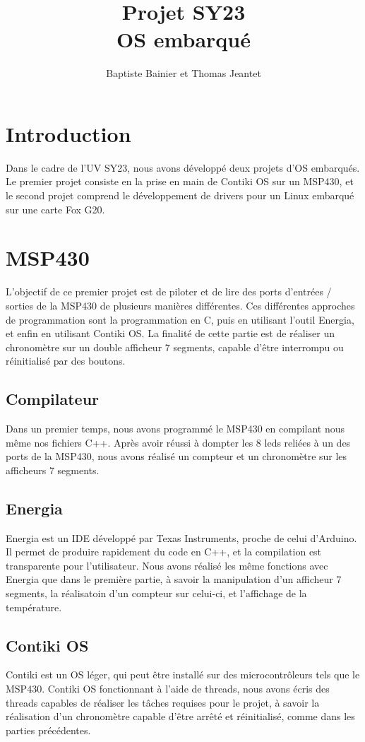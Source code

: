 \documentclass[a4paper,12pt]{article}
\author{Baptiste Bainier et Thomas Jeantet}
\title{Projet SY23\\OS embarqué}
\begin{document}
\maketitle
\newpage
\newpage


\section*{Introduction}

Dans le cadre de l'UV SY23, nous avons développé deux projets d'OS embarqués. Le premier projet consiste en la prise en main de Contiki OS sur un MSP430, et le second projet comprend le développement de drivers pour un Linux embarqué sur une carte Fox G20.

\bigskip
\tableofcontents

\newpage
\section{MSP430}
  L'objectif de ce premier projet est de piloter et de lire des ports d'entrées / sorties de la MSP430 de plusieurs manières différentes. Ces différentes approches de programmation sont la programmation en C, puis en utilisant l'outil Energia, et enfin en utilisant Contiki OS. La finalité de cette partie est de réaliser un chronomètre sur un double afficheur 7 segments, capable d'être interrompu ou réinitialisé par des boutons.
  \subsection{Compilateur}
  	Dans un premier temps, nous avons programmé le MSP430 en compilant nous même nos fichiers C++. Après avoir réussi à dompter les 8 leds reliées à un des ports de la MSP430, nous avons réalisé un compteur et un chronomètre sur les afficheurs 7 segments.

  \subsection{Energia}
  	Energia est un IDE développé par Texas Instruments, proche de celui d'Arduino. Il permet de produire rapidement du code en C++, et la compilation est transparente pour l'utilisateur. Nous avons réalisé les même fonctions avec Energia que dans le première partie, à savoir la manipulation d'un afficheur 7 segments, la réalisatoin d'un compteur sur celui-ci, et l'affichage de la température.

  \subsection{Contiki OS}
  	Contiki est un OS léger, qui peut être installé sur des microcontrôleurs tels que le MSP430. Contiki OS fonctionnant à l'aide de threads, nous avons écris des threads capables de réaliser les tâches requises pour le projet, à savoir la réalisation d'un chronomètre capable d'être arrêté et réinitialisé, comme dans les parties précédentes.
\end{document}
